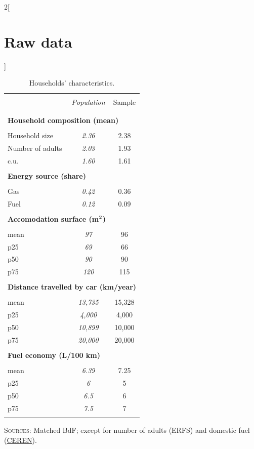 \documentclass[12pt]{article} %
\begin{document}
\begin{appendices}
\begin{multicols}{2}[\section{Raw data\label{sec:Raw-Data}}]
\begin{table}[H]
    \caption{Households' characteristics.\label{tab:app-energetic-characs}}
\centering
\begin{tabular}{lcc}
\hline \hline  \\[-1.8ex]
 & \emph{Population} & Sample  \tabularnewline \\[-1.8ex]
\hline  \\[-1.8ex]
\multicolumn{3}{l}{\textbf{Household composition (mean)}} \tabularnewline  \\[-1.8ex]
Household size & \emph{2.36} & 2.38\tabularnewline
Number of adults & \emph{2.03} & 1.93\tabularnewline
c.u. & \emph{1.60} & 1.61\tabularnewline
\hline   \\[-1.8ex]
\multicolumn{3}{l}{\textbf{Energy source (share)}} \tabularnewline  \\[-1.8ex]
Gas & \emph{0.42} & 0.36\tabularnewline
Fuel & \emph{0.12} & 0.09\tabularnewline
\hline   \\[-1.8ex]
\multicolumn{3}{l}{\textbf{Accomodation surface (m$^\textnormal{2}$)}} \tabularnewline  \\[-1.8ex]
mean & \emph{97} & 96\tabularnewline
p25 & \emph{69} & 66\tabularnewline
p50 & \emph{90} & 90\tabularnewline
p75 & \emph{120} & 115\tabularnewline
\hline   \\[-1.8ex]
\multicolumn{3}{l}{\textbf{Distance travelled by car (km/year)}} \tabularnewline  \\[-1.8ex]
mean & \emph{13,735} & 15,328\tabularnewline
p25 & \emph{4,000} & 4,000\tabularnewline
p50 & \emph{10,899} & 10,000 \tabularnewline
p75 & \emph{20,000 } & 20,000 \tabularnewline
\hline   \\[-1.8ex]
\multicolumn{3}{l}{\textbf{Fuel economy (L/100 km)}} \tabularnewline  \\[-1.8ex]
mean & \emph{6.39} & 7.25\tabularnewline
p25 & \emph{6} & 5\tabularnewline
p50 & \emph{6.5} & 6\tabularnewline
p75 & \emph{7.5} & 7\tabularnewline  \\[-1.8ex]
\hline \hline 
\end{tabular}\bigskip{}

     \footnotesize{\textsc{Sources:} Matched BdF; except for number of adults (ERFS) and domestic fuel (\href{https://www.lesechos.fr/industrie-services/energie-environnement/le-chauffage-au-fioul-devient-de-plus-en-plus-cher-147372}{CEREN}).} %
\end{table}


\end{multicols}
\end{appendices}
\end{document}

